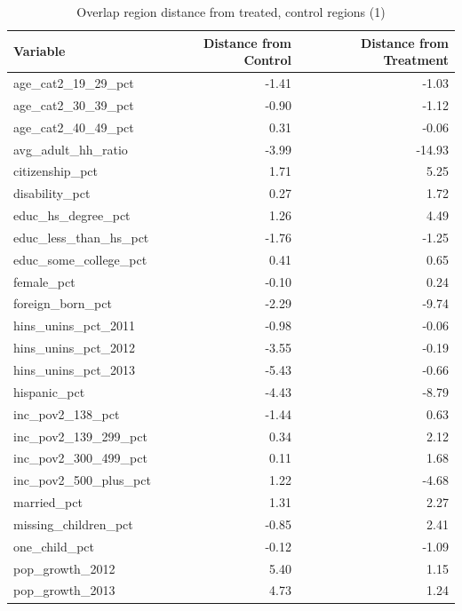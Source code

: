 \documentclass[12pt]{article}
\begin{document}
\begin{table}[ht]
\centering
\begin{tabular}{lrr}
  \hline
Variable & Distance from Control & Distance from Treatment \\ 
  \hline
age\_cat2\_19\_29\_pct & -1.41 & -1.03 \\ 
  age\_cat2\_30\_39\_pct & -0.90 & -1.12 \\ 
  age\_cat2\_40\_49\_pct & 0.31 & -0.06 \\ 
  avg\_adult\_hh\_ratio & -3.99 & -14.93 \\ 
  citizenship\_pct & 1.71 & 5.25 \\ 
  disability\_pct & 0.27 & 1.72 \\ 
  educ\_hs\_degree\_pct & 1.26 & 4.49 \\ 
  educ\_less\_than\_hs\_pct & -1.76 & -1.25 \\ 
  educ\_some\_college\_pct & 0.41 & 0.65 \\ 
  female\_pct & -0.10 & 0.24 \\ 
  foreign\_born\_pct & -2.29 & -9.74 \\ 
  hins\_unins\_pct\_2011 & -0.98 & -0.06 \\ 
  hins\_unins\_pct\_2012 & -3.55 & -0.19 \\ 
  hins\_unins\_pct\_2013 & -5.43 & -0.66 \\ 
  hispanic\_pct & -4.43 & -8.79 \\ 
  inc\_pov2\_138\_pct & -1.44 & 0.63 \\ 
  inc\_pov2\_139\_299\_pct & 0.34 & 2.12 \\ 
  inc\_pov2\_300\_499\_pct & 0.11 & 1.68 \\ 
  inc\_pov2\_500\_plus\_pct & 1.22 & -4.68 \\ 
  married\_pct & 1.31 & 2.27 \\ 
  missing\_children\_pct & -0.85 & 2.41 \\ 
  one\_child\_pct & -0.12 & -1.09 \\ 
  pop\_growth\_2012 & 5.40 & 1.15 \\ 
  pop\_growth\_2013 & 4.73 & 1.24 \\ 
   \hline
    \end{tabular}
    \caption{Overlap region distance from treated, control regions (1)}
    \label{oatedist1}
\end{table}
\end{document}
